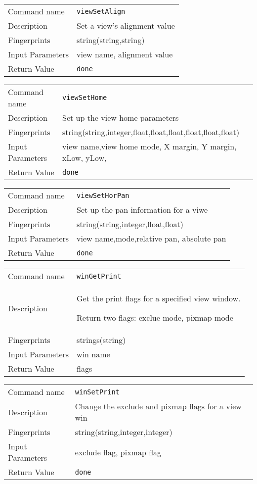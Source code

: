 \noindent
\begin{tabular}{l|p{5in}}
\hline
Command name &{\tt viewSetAlign }\\ 
Description &
Set a view's alignment value
 	\\
Fingerprints & string(string,string)\\
Input Parameters&view name, alignment value\\
Return Value&{\tt done}\\
\hline
\end{tabular}
\bigskip

\noindent
\begin{tabular}{l|p{5in}}
\hline
Command name &{\tt viewSetHome }\\ 
Description &
Set up the view home parameters
 	\\
Fingerprints & string(string,integer,float,float,float,float,float,float)\\
Input Parameters&view name,view home mode, X margin, Y margin, xLow, yLow,\\
Return Value&{\tt done}\\
\hline
\end{tabular}
\bigskip

\noindent
\begin{tabular}{l|p{5in}}
\hline
Command name &{\tt viewSetHorPan }\\ 
Description &
Set up the pan information for a viwe
 	\\
Fingerprints & string(string,integer,float,float)\\
Input Parameters&view name,mode,relative pan, absolute pan\\
Return Value&{\tt done}\\
\hline
\end{tabular}
\bigskip

\noindent
\begin{tabular}{l|p{5in}}
\hline
Command name &{\tt winGetPrint }\\ 
Description &
Get the print flags for a specified view window. 
 
Return two flags: exclue mode, pixmap mode
 	\\
Fingerprints & strings(string)\\
Input Parameters&win name\\
Return Value&flags\\
\hline
\end{tabular}
\bigskip

\noindent
\begin{tabular}{l|p{5in}}
\hline
Command name &{\tt winSetPrint }\\ 
Description &
Change the exclude and pixmap flags for a view win
 	\\
Fingerprints & string(string,integer,integer)\\
Input Parameters&exclude flag, pixmap flag\\
Return Value&{\tt done}\\
\hline
\end{tabular}
\bigskip


